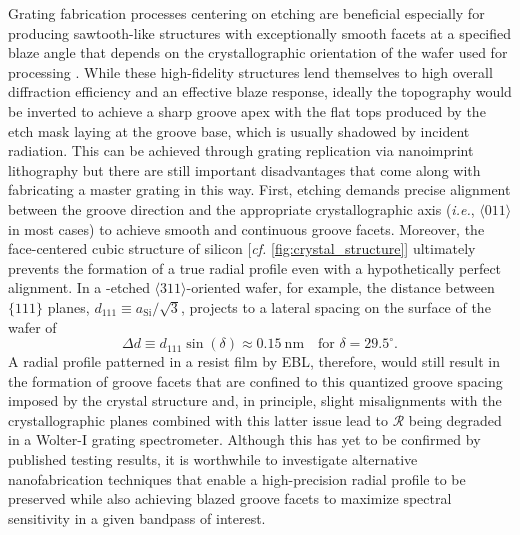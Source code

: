 Grating fabrication processes centering on  etching are beneficial especially for producing sawtooth-like structures with exceptionally smooth facets at a specified blaze angle that depends on the crystallographic orientation of the wafer used for processing \cite{Franke97,McEntaffer13,DeRoo16thesis}. 
While these high-fidelity structures lend themselves to high overall diffraction efficiency and an effective blaze response, ideally the topography would be inverted to achieve a sharp groove apex with the flat tops produced by the  etch mask laying at the groove base, which is usually shadowed by incident radiation. 
This can be achieved through grating replication via nanoimprint lithography \cite[\emph{cf.\@} \cref{sec:nanoimprint}]{Chang03} but there are still important disadvantages that come along with fabricating a master grating in this way. %
First,  etching demands precise alignment between the groove direction and the appropriate crystallographic axis (\emph{i.e.}, $\langle 011 \rangle$ in most cases) to achieve smooth and continuous groove facets. 
Moreover, the face-centered cubic structure of silicon [\emph{cf.\@} \cref{fig:crystal_structure}] ultimately prevents the formation of a true radial profile even with a hypothetically perfect alignment. 
In a -etched $\langle 311 \rangle$-oriented wafer, for example, the distance between $\{ 111 \}$ planes, $d_{111} \equiv a_{\text{Si}}/\sqrt{3}$, projects to a lateral spacing on the surface of the wafer of 
\begin{equation}
 \Delta d \equiv d_{111} \sin \left( \delta \right) \approx \SI{0.15}{\nm} \quad \text{for } \delta = 29.5^{\circ} . 
 \end{equation}
A radial profile patterned in a resist film by EBL, therefore, would still result in the formation of groove facets that are confined to this quantized groove spacing imposed by the crystal structure and, in principle, slight misalignments with the crystallographic planes combined with this latter issue lead to $\mathscr{R}$ being degraded in a Wolter-I grating spectrometer. 
Although this has yet to be confirmed by published testing results, it is worthwhile to investigate alternative nanofabrication techniques that enable a high-precision radial profile to be preserved while also achieving blazed groove facets to maximize spectral sensitivity in a given bandpass of interest. 

